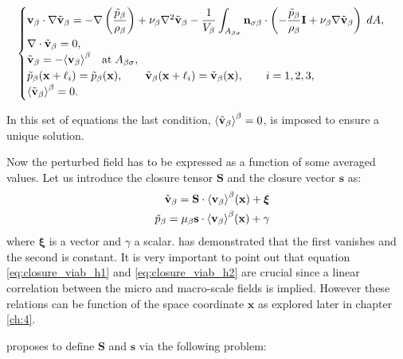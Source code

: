 \begin{eqnarray}
\begin{cases}
\textbf{v}_{\beta} \cdot \nabla \tilde{\textbf{v}}_{\beta} = -\nabla \left(\dfrac{\tilde{p}_{\beta}}{\rho_{\beta}}\right) + \nu_{\beta} \nabla^2 \tilde{\textbf{v}}_{\beta} - \dfrac{1}{V_\beta} \displaystyle \int_{A_{\beta \sigma}} \mathbf{n}_{\sigma \beta}  \cdot \left(-\dfrac{\tilde{p}_{\beta}}{\rho_{\beta}} \mathbf{I}  + \nu_{\beta} \nabla \tilde{\textbf{v}}_{\beta} \right)  \;dA,  \\
\nabla \cdot \tilde{\textbf{v}}_{\beta} = 0, \\
\tilde{\textbf{v}}_{\beta} = -{\left< \textbf{v}_{\beta} \right>}^{\beta} \quad \textrm{at} \; A_{\beta \sigma}, \\
\tilde{p}_{\beta}(\mathbf{x} +\ell_i) = \tilde{p}_{\beta}(\mathbf{x}), \qquad \tilde{\textbf{v}}_{\beta}(\mathbf{x} +\ell_i) = \tilde{\textbf{v}}_{\beta}(\mathbf{x}), \qquad i=1,2,3 ,\\
{\left< \tilde{\textbf{v}}_{\beta} \right>}^{\beta} = 0.
\end{cases}
\label{eq:vans_mom_2}
\end{eqnarray}

In this set of equations the last condition, ${\left< \tilde{\textbf{v}}_{\beta} \right>}^{\beta} = 0$, is imposed to ensure a unique solution.

Now the perturbed field has to be expressed as a function of some averaged values. Let us introduce the closure tensor $\mathbf{S}$ and  the closure vector $\mathbf{s}$ as:
\begin{eqnarray}
&& \tilde{\textbf{v}}_{\beta}= \mathbf{S} \cdot {\left< \textbf{v}_{\beta}\right>}^{\beta}(\mathbf{x})  +\boldsymbol{\xi}  	\label{eq:closure_viab_h1} \\
&& \tilde{p}_{\beta}  = \mu_{\beta} \mathbf{s}  \cdot {\left< \textbf{v}_{\beta}\right>}^{\beta}(\mathbf{x})  + \gamma \label{eq:closure_viab_h2}
\end{eqnarray}
where $\boldsymbol{\xi}$ is a vector and $\gamma$ a scalar. \citet{whitaker1996forchheimer} has demonstrated that the first vanishes and the second is constant.
It is very important to point out that equation \eqref{eq:closure_viab_h1} and \eqref{eq:closure_viab_h2} are crucial since a linear correlation between the micro and macro-scale fields is implied.
However these relations can be function of the space coordinate $\mathbf{x}$ as explored later in chapter \ref{ch:4}.

\citet{whitaker1996forchheimer} proposes to define $\mathbf{S}$ and $\mathbf{s}$ via the following problem:


